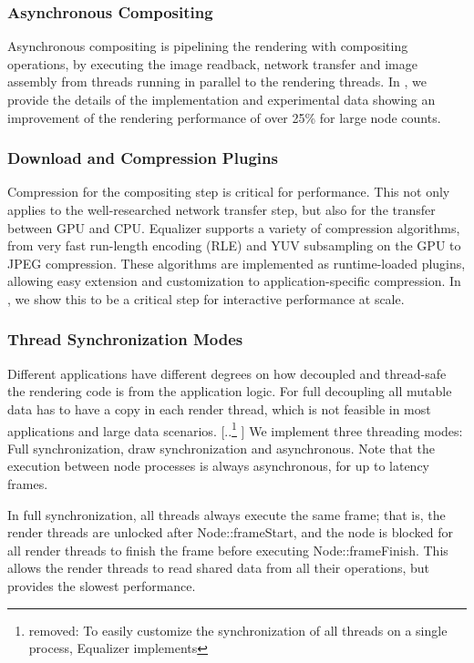 \documentclass[10pt,journal,compsoc]{IEEEtran}
\providecommand{\DIFaddtex}[1]{{\protect\color{blue} \sf #1}} %
\providecommand{\DIFdeltex}[1]{{\protect\color{red} [..\footnote{removed: #1} ]}} %
\providecommand{\DIFaddbegin}{} %
\providecommand{\DIFaddend}{} %
\providecommand{\DIFdelbegin}{} %
\providecommand{\DIFdelend}{} %
\providecommand{\DIFadd}[1]{\texorpdfstring{\DIFaddtex{#1}}{#1}} %
\providecommand{\DIFdel}[1]{\texorpdfstring{\DIFdeltex{#1}}{}} %
\newcommand{\DIFscaledelfig}{0.5}
\newlength{\DIFdelgraphicswidth} %
\newlength{\DIFdelgraphicsheight} %
\newcommand{\DIFaddincludegraphics}[2][]{{\color{blue}\fbox{\DIFOincludegraphics[#1]{#2}}}} %
\newcommand{\DIFdelincludegraphics}[2][]{%
\sbox{\DIFdelgraphicsbox}{\DIFOincludegraphics[#1]{#2}}%
\settoboxwidth{\DIFdelgraphicswidth}{\DIFdelgraphicsbox} %
\settoboxtotalheight{\DIFdelgraphicsheight}{\DIFdelgraphicsbox} %
\scalebox{\DIFscaledelfig}{%
\parbox[b]{\DIFdelgraphicswidth}{\usebox{\DIFdelgraphicsbox}\\[-\baselineskip] \rule{\DIFdelgraphicswidth}{0em}}\llap{\resizebox{\DIFdelgraphicswidth}{\DIFdelgraphicsheight}{%
\setlength{\unitlength}{\DIFdelgraphicswidth}%
\begin{picture}(1,1)%
\thicklines\linethickness{2pt} %
{\color[rgb]{1,0,0}\put(0,0){\framebox(1,1){}}}%
{\color[rgb]{1,0,0}\put(0,0){\line( 1,1){1}}}%
{\color[rgb]{1,0,0}\put(0,1){\line(1,-1){1}}}%
\end{picture}%
}\hspace*{3pt}}} %
} %
\DeclareRobustCommand{\DIFaddbegin}{\DIFOaddbegin \let\includegraphics\DIFaddincludegraphics} %
\DeclareRobustCommand{\DIFaddend}{\DIFOaddend \let\includegraphics\DIFOincludegraphics} %
\DeclareRobustCommand{\DIFdelbegin}{\DIFOdelbegin \let\includegraphics\DIFdelincludegraphics} %
\DeclareRobustCommand{\DIFdelend}{\DIFOaddend \let\includegraphics\DIFOincludegraphics} %
\begin{document}
\subsubsection{Asynchronous Compositing}

Asynchronous compositing is pipelining the rendering with compositing operations, by
executing the image readback, network transfer and image assembly from threads
running in parallel to the rendering threads. In \cite{EBAHMP:12}, we provide
the details of the implementation and experimental data showing an improvement
of the rendering performance of over 25\% for large node counts.

\subsubsection{Download and Compression Plugins}

Compression for the compositing step is critical for performance. This not only
applies to the well-researched network transfer step, but also for the transfer
between GPU and CPU. \textsf{Equalizer} supports a variety of compression
algorithms, from very fast run-length encoding (RLE) and YUV subsampling on the GPU to JPEG
compression. These algorithms are implemented as runtime-loaded plugins,
allowing easy extension and customization to application-specific compression.
In \cite{MEP:10}, we show this to be a critical step for interactive performance
at scale.

\subsubsection{Thread Synchronization Modes}\label{sec:threading}

Different applications have different degrees on how decoupled and thread-safe
the rendering code is from the application logic. For full decoupling all
mutable data has to have a copy in each render thread, which is not feasible in
most applications and large data scenarios. \DIFdelbegin \DIFdel{To easily customize the
synchronization of all threads on a single process, \textsf{Equalizer}
implements }\DIFdelend \DIFaddbegin \DIFadd{We implement }\DIFaddend three threading modes:
Full synchronization, draw synchronization and asynchronous. Note that the
execution between node processes is always asynchronous, for up to
\textsf{latency} frames.

In full synchronization, all threads always execute the same frame; that is, the
render threads are unlocked after \textsf{Node::frameStart}, and the node is
blocked for all render threads to finish the frame before executing
\textsf{Node::frameFinish}. This allows the render threads to read shared data
from all their operations, but provides the slowest performance.
\end{document}
